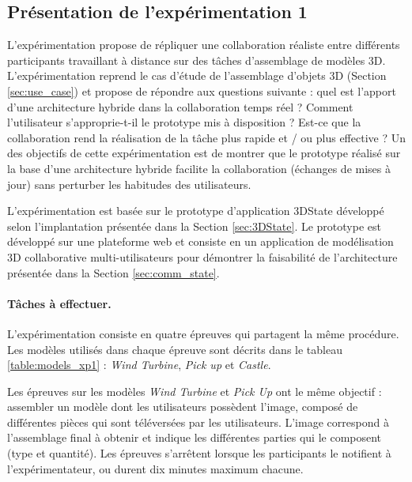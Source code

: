 
\subsection{Présentation de l'expérimentation 1}

L'expérimentation propose de répliquer une collaboration réaliste entre 
différents participants travaillant à distance sur des tâches d'assemblage de 
modèles \gls{3D}. L'expérimentation reprend le cas d'étude de l'assemblage 
d'objets \gls{3D} (Section \ref{sec:use_case}) et propose de répondre aux 
questions suivante : quel est l'apport d'une architecture hybride dans la 
collaboration temps réel ? Comment l'utilisateur s'approprie-t-il le prototype mis à 
disposition ? Est-ce que la collaboration rend la réalisation de la tâche plus rapide 
et / ou plus effective ? Un des objectifs de cette expérimentation est de montrer 
que le prototype réalisé sur la base d'une architecture hybride facilite la 
collaboration (échanges de mises à jour) sans perturber les habitudes des 
utilisateurs.

L'expérimentation est basée sur le prototype d'application 3DState développé 
selon l'implantation présentée dans la Section \ref{sec:3DState}.
Le prototype est développé sur une plateforme web et consiste en un application 
de modélisation \gls{3D} collaborative multi-utilisateurs pour démontrer la 
faisabilité de l'architecture présentée dans la Section \ref{sec:comm_state}. 


\paragraph{Tâches à effectuer.}
L'expérimentation consiste en quatre épreuves qui partagent la même procédure.
Les modèles utilisés dans chaque épreuve sont décrits dans le tableau 
\ref{table:models_xp1} : \textit{Wind Turbine}, \textit{Pick up} et \textit{Castle}. 

Les épreuves sur les modèles \textit{Wind Turbine} et \textit{Pick Up} ont le 
même objectif : 
assembler un modèle dont les utilisateurs possèdent l'image, composé de 
différentes pièces qui sont téléversées par les utilisateurs. L'image correspond à 
l'assemblage final à obtenir et indique les différentes parties qui le 
composent (type et quantité). Les épreuves s'arrêtent lorsque les participants 
le notifient à l'expérimentateur, ou durent dix minutes maximum chacune.

